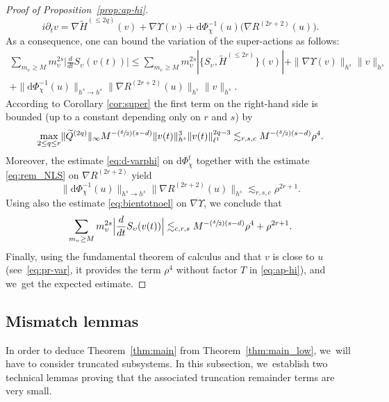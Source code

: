 \documentclass[JEP,XML,SOM,Unicode,published]{cedram}
\newcommand{\Psfrac}[2]{(\sfrac{#1}{#2})}
\theoremstyle{plain}
\theoremstyle{definition}
\newcommand{\1}{\mathbf{1}}
\begin{document}
\begin{proof}[Proof of Proposition~\ref{prop:ap-hi}]
\[
i\partial_{t}v = \nabla \widetilde{H}^{(\leq 2q)}(v) + \nabla \Upsilon (v) + \mathrm{d}\Phi_\chi^{-1}(u)\bigl(\nabla R^{(2r+2)}(u)\bigr).
\]
As a consequence, one can bound the variation of the super-actions as follows:
\begin{multline}
\label{eq:pr-v}
\sum_{m_\upsilon \geq M}m_\upsilon^{2s}\Big|\frac{d}{dt}S_{\upsilon}(v(t))\Big|
\leq \sum_{m_\upsilon \geq M}m_\upsilon^{2s}|\{S_{\upsilon},\widetilde{H}^{(\leq 2r)}\}(v)|
+ \|\nabla \Upsilon (v)\|_{h^{s}}\|v\|_{h^{s}}\\+\|\mathrm{d}\Phi_\chi^{-1}(u)\|_{h^{s}\to h^{s}}\|\nabla R^{(2r+2)}(u)\|_{h^{s}}\|v\|_{h^{s}}.
\end{multline}
According to Corollary \ref{cor:super} the first term on the right-hand side is bounded (up to a constant depending only on $r$ and $s$) by
\[
\underset{2\leq q \leq r}{\max} \|\widetilde{Q}^{(2q)}\|_{\infty} M^{-\Psfrac{\delta}{2}(s-d)}\|v(t)\|_{h^{s}}^{3} \|v(t)\|_{\ell^{1}}^{2q-3} \lesssim_{r,s,c} M^{-\Psfrac{\delta}{2}(s-d)} \rho^4.
\]
Moreover, the estimate \eqref{eq:d-varphi} on $\mathrm{d}\Phi_\chi^{t}$ together with the estimate \eqref{eq:rem_NLS} on $\nabla R^{(2r+2)}$ yield
\[
\|\mathrm{d}\Phi_\chi^{-1}(u)\|_{h^{s}\to h^{s}}\| \nabla R^{(2r+2)} (u)\|_{h^{s}} \lesssim_{r,s,c} \rho^{2r+1}.
\]
Using also the estimate \eqref{eq:bientotnoel} on $\nabla \Upsilon$,
we conclude that
\[
\sum_{m_\upsilon \geq M}m_\upsilon^{2s}\Big|\frac{d}{dt}S_{\upsilon}(v(t))\Big| \lesssim_{c,r,s} M^{-\Psfrac{\delta}{2}(s-d)} \rho^4+ \rho^{2r+1}.
\]
Finally, using the fundamental theorem of calculus and that $v$ is close to $u$ (see~\eqref{eq:pr-var}, it provides the term $\rho^4$ without factor $T$ in \eqref{eq:ap-hi}), and we~get the expected estimate.
\end{proof}

\subsection{Mismatch lemmas} In order to deduce Theorem~\ref{thm:main} from Theorem~\ref{thm:main_low}, we~will have to consider truncated subsystems. In this subsection, we~establish two technical lemmas proving that the associated truncation remainder terms are very small.
\end{document}
